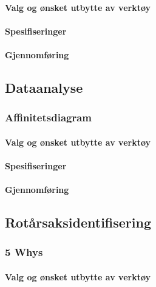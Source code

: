 \paragraph{Valg og ønsket utbytte av verktøy}


\paragraph{Spesifiseringer}


\paragraph{Gjennomføring}



\subsection{Dataanalyse}

\subsubsection{Affinitetsdiagram}

\paragraph{Valg og ønsket utbytte av verktøy}


\paragraph{Spesifiseringer}


\paragraph{Gjennomføring}



\subsection{Rotårsaksidentifisering}

\subsubsection{5 Whys}

\paragraph{Valg og ønsket utbytte av verktøy}


